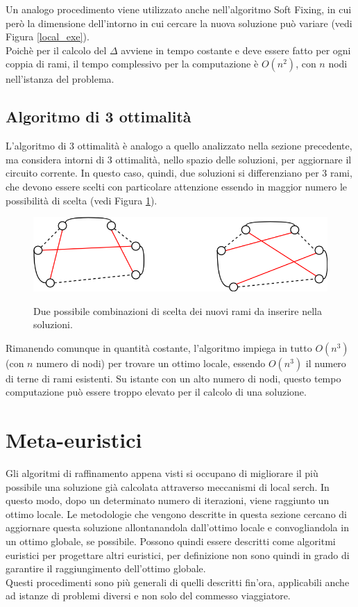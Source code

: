 Un analogo procedimento viene utilizzato anche nell'algoritmo Soft Fixing, in cui però la dimensione dell'intorno in cui cercare la nuova soluzione può variare (vedi Figura \ref{local_exe}).\\
Poichè per il calcolo del $\Delta$ avviene in tempo costante e deve essere fatto per ogni coppia di rami, il tempo complessivo per la computazione è $O(n^2)$, con $n$ nodi nell'istanza del problema.
\subsection{Algoritmo di 3 ottimalità}
L'algoritmo di 3 ottimalità è analogo a quello analizzato nella sezione precedente, ma considera intorni di 3 ottimalità, nello spazio delle soluzioni, per aggiornare il circuito corrente. In questo caso, quindi, due soluzioni si differenziano per 3 rami, che devono essere scelti con particolare attenzione essendo in maggior numero le possibilità di scelta (vedi Figura \ref{three_optimality}).
\begin{figure}[h] 
\begin{center} 
  \includegraphics[scale=0.4]{Images/three_exchange}\\ 
  \caption{\footnotesize{Due possibile combinazioni di scelta dei nuovi rami da inserire nella soluzioni.}}
  \label{three_optimality}
\end{center}
\end{figure}
Rimanendo comunque in quantità costante, l'algoritmo impiega in tutto $O(n^3)$ (con $n$ numero di nodi) per trovare un ottimo locale, essendo $O(n^3)$ il numero di terne di rami esistenti. Su istante con un alto numero di nodi, questo tempo computazione può essere troppo elevato per il calcolo di una soluzione. 
\section{Meta-euristici}
Gli algoritmi di raffinamento appena visti si occupano di migliorare il più possibile una soluzione già calcolata attraverso meccanismi di local serch. In questo modo, dopo un determinato numero di iterazioni, viene raggiunto un ottimo locale. Le metodologie che vengono descritte in questa sezione cercano di aggiornare questa soluzione allontanandola dall'ottimo locale e convogliandola in un ottimo globale, se possibile. Possono quindi essere descritti come algoritmi euristici per progettare altri euristici, per definizione non sono quindi in grado di garantire il raggiungimento dell'ottimo globale.\\
Questi procedimenti sono più generali di quelli descritti fin'ora, applicabili anche ad istanze di problemi diversi e non solo del commesso viaggiatore. 
